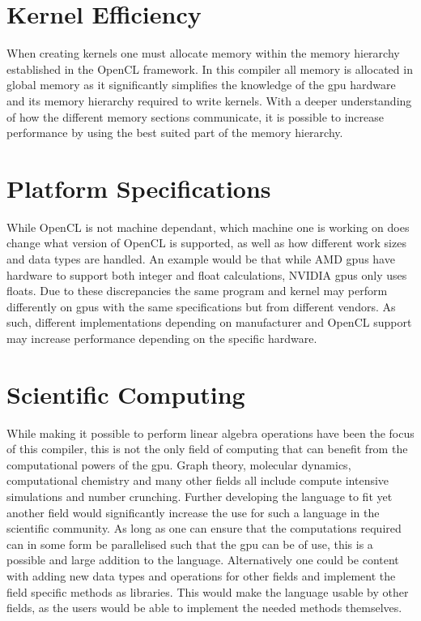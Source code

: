 \section{Kernel Efficiency}
When creating kernels one must allocate memory within the memory hierarchy established in the OpenCL framework.
In this compiler all memory is allocated in global memory as it significantly simplifies the knowledge of the \acrshort{gpu} hardware and its memory hierarchy required to write kernels.
With a deeper understanding of how the different memory sections communicate, it is possible to increase performance by using the best suited part of the memory hierarchy. \citep{ocl_lecture3}

\section{Platform Specifications}
While OpenCL is not machine dependant, which machine one is working on does change what version of OpenCL is supported, as well as how different work sizes and data types are handled.
An example would be that while AMD \acrshort{gpu}s have hardware to support both integer and float calculations, NVIDIA \acrshort{gpu}s only uses floats. \citep{CUDAOpenCLOptimisation}
Due to these discrepancies the same program and kernel may perform differently on \acrshort{gpu}s with the same specifications but from different vendors.
As such, different implementations depending on manufacturer and OpenCL support may increase performance depending on the specific hardware.

\section{Scientific Computing}
While making it possible to perform linear algebra operations have been the focus of this compiler, this is not the only field of computing that can benefit from the computational powers of the \acrshort{gpu}.
Graph theory, molecular dynamics, computational chemistry and many other fields all include compute intensive simulations and number crunching.
Further developing the language to fit yet another field would significantly increase the use for such a language in the scientific community.
As long as one can ensure that the computations required can in some form be parallelised such that the \acrshort{gpu} can be of use, this is a possible and large addition to the language.
Alternatively one could be content with adding new data types and operations for other fields and implement the field specific methods as libraries.
This would make the language usable by other fields, as the users would be able to implement the needed methods themselves.

